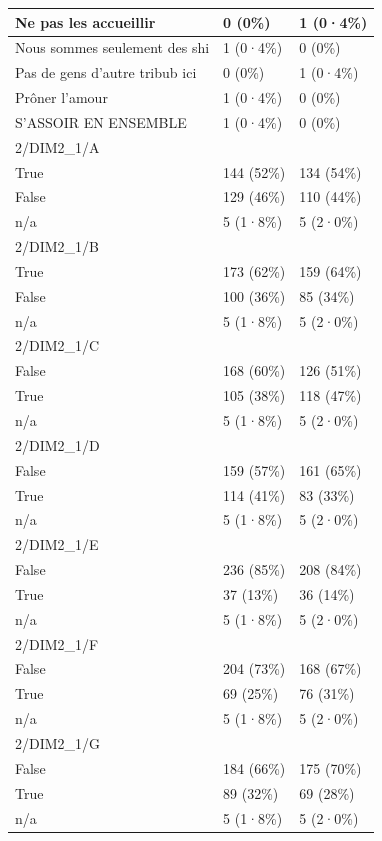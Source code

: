 \documentclass[
]{book}
\begin{document}
\begin{tabular}{l|l|l}
\hline
Ne pas les accueillir & 0 (0\%) & 1 (0·4\%)\\
\hline
Nous sommes seulement des shi & 1 (0·4\%) & 0 (0\%)\\
\hline
Pas de gens d'autre tribub ici & 0 (0\%) & 1 (0·4\%)\\
\hline
Prôner l'amour & 1 (0·4\%) & 0 (0\%)\\
\hline
S'ASSOIR EN ENSEMBLE & 1 (0·4\%) & 0 (0\%)\\
\hline
2/DIM2\_1/A &  & \\
\hline
True & 144 (52\%) & 134 (54\%)\\
\hline
False & 129 (46\%) & 110 (44\%)\\
\hline
n/a & 5 (1·8\%) & 5 (2·0\%)\\
\hline
2/DIM2\_1/B &  & \\
\hline
True & 173 (62\%) & 159 (64\%)\\
\hline
False & 100 (36\%) & 85 (34\%)\\
\hline
n/a & 5 (1·8\%) & 5 (2·0\%)\\
\hline
2/DIM2\_1/C &  & \\
\hline
False & 168 (60\%) & 126 (51\%)\\
\hline
True & 105 (38\%) & 118 (47\%)\\
\hline
n/a & 5 (1·8\%) & 5 (2·0\%)\\
\hline
2/DIM2\_1/D &  & \\
\hline
False & 159 (57\%) & 161 (65\%)\\
\hline
True & 114 (41\%) & 83 (33\%)\\
\hline
n/a & 5 (1·8\%) & 5 (2·0\%)\\
\hline
2/DIM2\_1/E &  & \\
\hline
False & 236 (85\%) & 208 (84\%)\\
\hline
True & 37 (13\%) & 36 (14\%)\\
\hline
n/a & 5 (1·8\%) & 5 (2·0\%)\\
\hline
2/DIM2\_1/F &  & \\
\hline
False & 204 (73\%) & 168 (67\%)\\
\hline
True & 69 (25\%) & 76 (31\%)\\
\hline
n/a & 5 (1·8\%) & 5 (2·0\%)\\
\hline
2/DIM2\_1/G &  & \\
\hline
False & 184 (66\%) & 175 (70\%)\\
\hline
True & 89 (32\%) & 69 (28\%)\\
\hline
n/a & 5 (1·8\%) & 5 (2·0\%)\\

\end{tabular}
\end{document}
